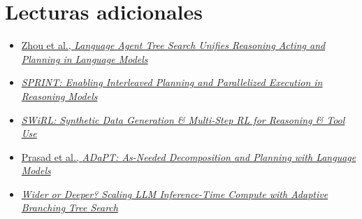 \section{Lecturas adicionales}

\begin{itemize}
    \item \href{https://arxiv.org/abs/2310.04406}{Zhou et al., \emph{Language Agent Tree Search Unifies Reasoning Acting and Planning in Language Models}}
    \item \href{https://arxiv.org/abs/2506.05745}{\emph{SPRINT: Enabling Interleaved Planning and Parallelized Execution in Reasoning Models}}
    \item \href{https://arxiv.org/abs/2504.04736}{\emph{SWiRL: Synthetic Data Generation \& Multi-Step RL for Reasoning \& Tool Use}}
    \item \href{https://arxiv.org/abs/2311.05772}{Prasad et al., \emph{ADaPT: As-Needed Decomposition and Planning with Language Models}}
    \item \href{https://arxiv.org/abs/2503.04412}{\emph{Wider or Deeper? Scaling LLM Inference-Time Compute with Adaptive Branching Tree Search}}
\end{itemize}

